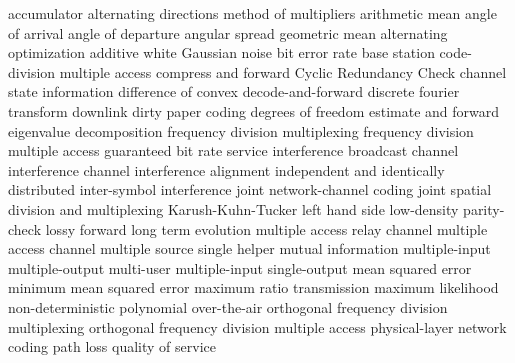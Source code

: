 
 {accumulator}
 {alternating directions method of multipliers}
   {arithmetic mean}
 {angle of arrival}
 {angle of departure}
 {angular spread}
   {geometric mean}
   {alternating optimization}
   {additive white Gaussian noise}
   {bit error rate}
   {base station}
   {code-division multiple access}
 {compress and forward}
 {Cyclic Redundancy Check}
   {channel state information}
 {difference of convex}
 {decode-and-forward}
 {discrete fourier transform}
   {downlink}
   {dirty paper coding}
   {degrees of freedom}
 {estimate and forward }
 {eigenvalue decomposition}
   {frequency division multiplexing}
   {frequency division multiple access}
   {guaranteed bit rate service}
   {interference broadcast channel}
   {interference channel}
   {interference alignment}
   {independent and identically distributed}
   {inter-symbol interference}
 {joint network-channel coding}
 {joint spatial division and multiplexing}
   {Karush-Kuhn-Tucker}
 {left hand side}
 {low-density parity-check}
 {lossy forward}
   {long term evolution}
 {multiple access relay channel}
 {multiple access channel}
 {multiple source single helper}
 {mutual information}
   {multiple-input multiple-output}
   {multi-user}
   {multiple-input single-output}
   {mean squared error}
   {minimum mean squared error}
   {maximum ratio transmission}
   {maximum likelihood}
   {non-deterministic polynomial}
   {over-the-air}
   {orthogonal frequency division multiplexing}
   {orthogonal frequency division multiple access}
 {physical-layer network coding}
   {path loss}
   {quality of service}
